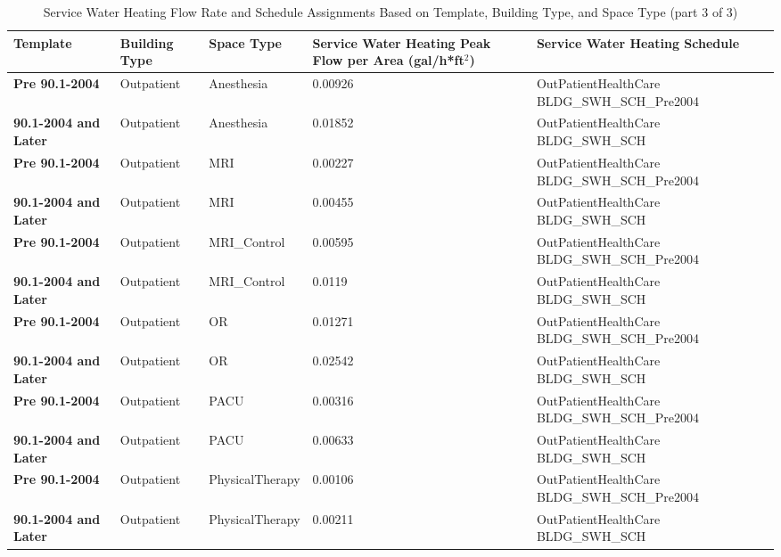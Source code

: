 \begin{table}
\centering
\small
\caption[Service Water Heating Flow Rate and Schedules Part 3]{Service Water Heating Flow Rate and Schedule Assignments Based on Template, Building Type, and Space Type (part 3 of 3)}
\label{tab:swh_flow_rates_p3}
\begin{tabular}{|p{3cm}|p{3cm}|p{3cm}|p{3cm}|p{3cm}|}
\hline
\textbf{Template} &
  \textbf{Building Type} &
  \textbf{Space Type} &
  \textbf{Service Water   Heating Peak Flow per Area (gal/h*ft$^2$)} &
  \textbf{Service Water   Heating Schedule} \\ \hline
\textbf{Pre 90.1-2004}  & Outpatient             & Anesthesia      & 0.00926 & OutPatientHealthCare   BLDG\_SWH\_SCH\_Pre2004 \\ \hline
\textbf{90.1-2004 and Later} & Outpatient             & Anesthesia      & 0.01852 & OutPatientHealthCare   BLDG\_SWH\_SCH          \\ \hline
\textbf{Pre 90.1-2004}  & Outpatient             & MRI             & 0.00227 & OutPatientHealthCare   BLDG\_SWH\_SCH\_Pre2004 \\ \hline
\textbf{90.1-2004 and Later} & Outpatient             & MRI             & 0.00455 & OutPatientHealthCare   BLDG\_SWH\_SCH          \\ \hline
\textbf{Pre 90.1-2004}  & Outpatient             & MRI\_Control    & 0.00595 & OutPatientHealthCare   BLDG\_SWH\_SCH\_Pre2004 \\ \hline
\textbf{90.1-2004 and Later} & Outpatient             & MRI\_Control    & 0.0119  & OutPatientHealthCare   BLDG\_SWH\_SCH          \\ \hline
\textbf{Pre 90.1-2004}  & Outpatient             & OR              & 0.01271 & OutPatientHealthCare   BLDG\_SWH\_SCH\_Pre2004 \\ \hline
\textbf{90.1-2004 and Later} & Outpatient             & OR              & 0.02542 & OutPatientHealthCare   BLDG\_SWH\_SCH          \\ \hline
\textbf{Pre 90.1-2004}  & Outpatient             & PACU            & 0.00316 & OutPatientHealthCare   BLDG\_SWH\_SCH\_Pre2004 \\ \hline
\textbf{90.1-2004 and Later} & Outpatient             & PACU            & 0.00633 & OutPatientHealthCare   BLDG\_SWH\_SCH          \\ \hline
\textbf{Pre 90.1-2004}  & Outpatient             & PhysicalTherapy & 0.00106 & OutPatientHealthCare   BLDG\_SWH\_SCH\_Pre2004 \\ \hline
\textbf{90.1-2004 and Later} & Outpatient             & PhysicalTherapy & 0.00211 & OutPatientHealthCare   BLDG\_SWH\_SCH          \\ \hline

\end{tabular}
\end{table}

